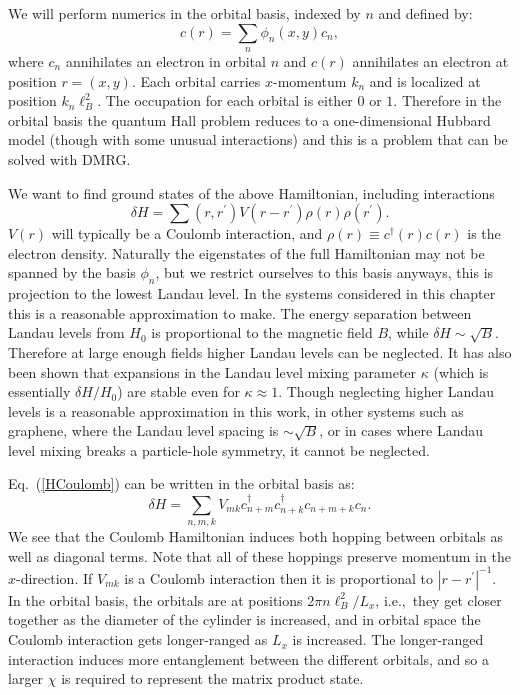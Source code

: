 We will perform numerics in the orbital basis, indexed by $n$ and defined by:
\begin{equation}
c(r)=\sum_n \phi_n(x,y)c_n,
\end{equation}
where $c_n$ annihilates an electron in orbital $n$ and $c(r)$ annihilates an electron at position $r=(x,y)$. Each orbital carries $x$-momentum $k_n$ and is localized at position $k_n\ell_B^2$. The occupation for each orbital is either $0$ or $1$. Therefore in the orbital basis the quantum Hall problem reduces to a one-dimensional Hubbard model (though with some unusual interactions) and this is a problem that can be solved with DMRG.
 
We want to find ground states of the above Hamiltonian, including interactions
\begin{equation}
\delta H=\sum(r,r^\prime) V(r-r^\prime) \rho(r)\rho(r^\prime).
\label{HCoulomb}
\end{equation}
$V(r)$ will typically be a Coulomb interaction, and $\rho(r)\equiv c^\dagger(r)c(r)$ is the electron density. Naturally the eigenstates of the full Hamiltonian may not be spanned by the basis $\phi_n$, but we restrict ourselves to this basis anyways, this is projection to the lowest Landau level. In the systems considered in this chapter this is a reasonable approximation to make. The energy separation between Landau levels from $H_0$ is proportional to the magnetic field $B$, while $\delta H\sim\sqrt{B}$. Therefore at large enough fields higher Landau levels can be neglected. It has also been shown that expansions in the Landau level mixing parameter $\kappa$ (which is essentially $\delta H/H_0$) are stable even for $\kappa\approx1$. Though neglecting higher Landau levels is a reasonable approximation in this work, in other systems such as graphene, where the Landau level spacing is $\sim\sqrt{B}$, or in cases where Landau level mixing breaks a particle-hole symmetry, it cannot be neglected. 

Eq.~(\ref{HCoulomb}) can be written in the orbital basis as: 
\begin{equation}
\delta H=\sum_{n,m,k} V_{mk} c^{\dagger}_{n+m} c_{n+k}^{\dagger} c_{n+m+k} c_{n}.
\end{equation}
We see that the Coulomb Hamiltonian induces both hopping between orbitals as well as diagonal terms. Note that all of these hoppings preserve momentum in the $x$-direction. If $V_{mk}$ is a Coulomb interaction then it is proportional to $|r-r^\prime|^{-1}$. In the orbital basis, the orbitals are at positions $2\pi n \ell_B^2/L_x$, i.e.,~they get closer together as the diameter of the cylinder is increased, and in orbital space the Coulomb interaction gets longer-ranged as $L_x$ is increased. The longer-ranged interaction induces more entanglement between the different orbitals, and so a larger $\chi$ is required to represent the matrix product state. 


